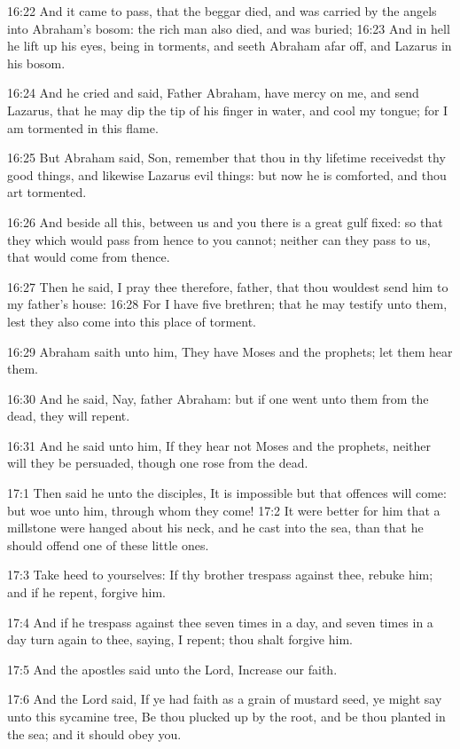 16:22 And it came to pass, that the beggar died, and was carried by
the angels into Abraham's bosom: the rich man also died, and was
buried; 16:23 And in hell he lift up his eyes, being in torments, and
seeth Abraham afar off, and Lazarus in his bosom.

16:24 And he cried and said, Father Abraham, have mercy on me, and
send Lazarus, that he may dip the tip of his finger in water, and cool
my tongue; for I am tormented in this flame.

16:25 But Abraham said, Son, remember that thou in thy lifetime
receivedst thy good things, and likewise Lazarus evil things: but now
he is comforted, and thou art tormented.

16:26 And beside all this, between us and you there is a great gulf
fixed: so that they which would pass from hence to you cannot; neither
can they pass to us, that would come from thence.

16:27 Then he said, I pray thee therefore, father, that thou wouldest
send him to my father's house: 16:28 For I have five brethren; that he
may testify unto them, lest they also come into this place of torment.

16:29 Abraham saith unto him, They have Moses and the prophets; let
them hear them.

16:30 And he said, Nay, father Abraham: but if one went unto them from
the dead, they will repent.

16:31 And he said unto him, If they hear not Moses and the prophets,
neither will they be persuaded, though one rose from the dead.

17:1 Then said he unto the disciples, It is impossible but that
offences will come: but woe unto him, through whom they come!  17:2 It
were better for him that a millstone were hanged about his neck, and
he cast into the sea, than that he should offend one of these little
ones.

17:3 Take heed to yourselves: If thy brother trespass against thee,
rebuke him; and if he repent, forgive him.

17:4 And if he trespass against thee seven times in a day, and seven
times in a day turn again to thee, saying, I repent; thou shalt
forgive him.

17:5 And the apostles said unto the Lord, Increase our faith.

17:6 And the Lord said, If ye had faith as a grain of mustard seed, ye
might say unto this sycamine tree, Be thou plucked up by the root, and
be thou planted in the sea; and it should obey you.

